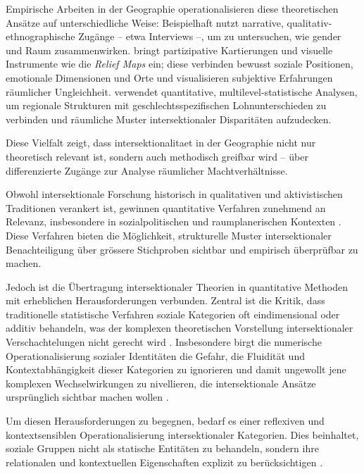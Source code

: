 Empirische Arbeiten in der Geographie operationalisieren diese theoretischen Ansätze auf unterschiedliche Weise: Beispielhaft nutzt \textcite{fensterRightGenderedCity2005} narrative, qualitativ-ethnographische Zugänge -- etwa Interviews --, um zu untersuchen, wie \gls{gender} und Raum zusammenwirken. \textcite{rodo-de-zarateDevelopingGeographiesIntersectionality2014} bringt partizipative Kartierungen und visuelle Instrumente wie die \emph{Relief Maps} ein; diese verbinden bewusst soziale Positionen, emotionale Dimensionen und Orte und visualisieren subjektive Erfahrungen räumlicher Ungleichheit. \textcite{mccallSpatialRoutesGender1998} verwendet quantitative, multilevel-statistische Analysen, um regionale Strukturen mit geschlechtsspezifischen Lohnunterschieden zu verbinden und räumliche Muster intersektionaler Disparitäten aufzudecken. 

Diese Vielfalt zeigt, dass \gls{intersektionalitaet} in der Geographie nicht nur theoretisch relevant ist, sondern auch methodisch greifbar wird -- über differenzierte Zugänge zur Analyse räumlicher Machtverhältnisse.


\vspace{2em}

Obwohl intersektionale Forschung historisch in qualitativen und aktivistischen Traditionen verankert ist, gewinnen quantitative Verfahren zunehmend an Relevanz, insbesondere in sozialpolitischen und raumplanerischen Kontexten \parencite{bauerIntersectionalityQuantitativeResearch2021}. Diese Verfahren bieten die Möglichkeit, strukturelle Muster intersektionaler Benachteiligung über grössere Stichproben sichtbar und empirisch überprüfbar zu machen.

Jedoch ist die Übertragung intersektionaler Theorien in quantitative Methoden mit erheblichen Herausforderungen verbunden. Zentral ist die Kritik, dass traditionelle statistische Verfahren soziale Kategorien oft eindimensional oder additiv behandeln, was der komplexen theoretischen Vorstellung intersektionaler Verschachtelungen nicht gerecht wird \parencite{hancockWhenMultiplicationDoesnt2007, bowlegInvitedReflectionQuantifying2016}. Insbesondere birgt die numerische Operationalisierung sozialer Identitäten die Gefahr, die Fluidität und Kontextabhängigkeit dieser Kategorien zu ignorieren und damit ungewollt jene komplexen Wechselwirkungen zu nivellieren, die intersektionale Ansätze ursprünglich sichtbar machen wollen \parencite{scottIntersectionalityQuantitativeMethods2017}.

Um diesen Herausforderungen zu begegnen, bedarf es einer reflexiven und kontextsensiblen Operationalisierung intersektionaler Kategorien. Dies beinhaltet, soziale Gruppen nicht als statische Entitäten zu behandeln, sondern ihre relationalen und kontextuellen Eigenschaften explizit zu berücksichtigen \parencite{rodo-de-zarateDevelopingGeographiesIntersectionality2014, websterCenteringSocialtechnicalRelations2021}.



